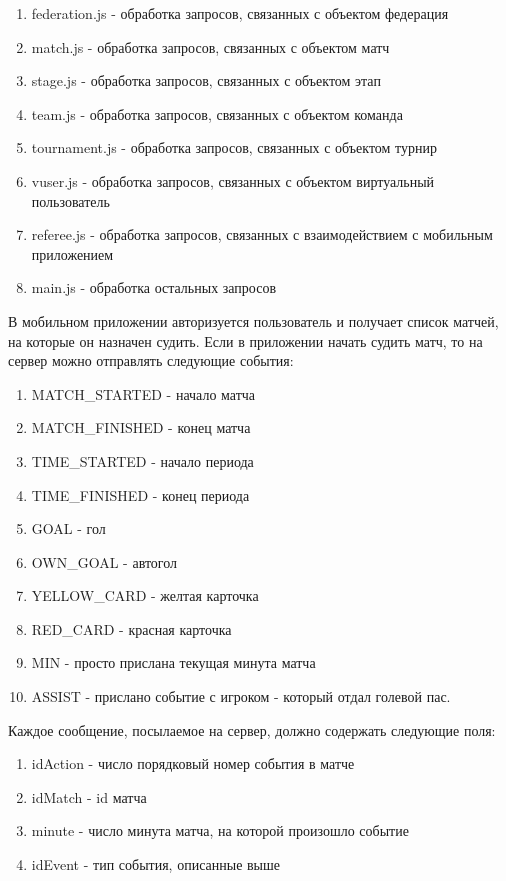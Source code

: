 \begin{enumerate}
	\item federation.js - обработка запросов, связанных с объектом федерация
	\item match.js - обработка запросов, связанных с объектом матч
	\item stage.js - обработка запросов, связанных с объектом этап
	\item team.js - обработка запросов, связанных с объектом команда
	\item tournament.js - обработка запросов, связанных с объектом турнир
	\item vuser.js - обработка запросов, связанных с объектом виртуальный пользователь
	\item referee.js - обработка запросов, связанных с взаимодействием с мобильным приложением
	\item main.js - обработка остальных запросов 
\end{enumerate}

В мобильном приложении авторизуется пользователь и получает список матчей, на которые он назначен судить. Если в приложении начать судить матч, то на сервер можно отправлять следующие события:
\begin{enumerate}
	\item MATCH\_STARTED - начало матча
	\item MATCH\_FINISHED - конец матча
	\item TIME\_STARTED - начало периода
	\item TIME\_FINISHED - конец периода
	\item GOAL - гол
	\item OWN\_GOAL - автогол
	\item YELLOW\_CARD - желтая карточка
	\item RED\_CARD - красная карточка
	\item MIN - просто прислана текущая минута матча
	\item ASSIST - прислано событие с игроком - который отдал голевой пас.
\end{enumerate}

Каждое сообщение, посылаемое на сервер, должно содержать следующие поля:
 \begin{enumerate}
	\item idAction - число порядковый номер события в матче 
	\item idMatch - id матча 
	\item minute - число минута матча, на которой произошло событие
	\item idEvent - тип события, описанные выше
\end{enumerate}

